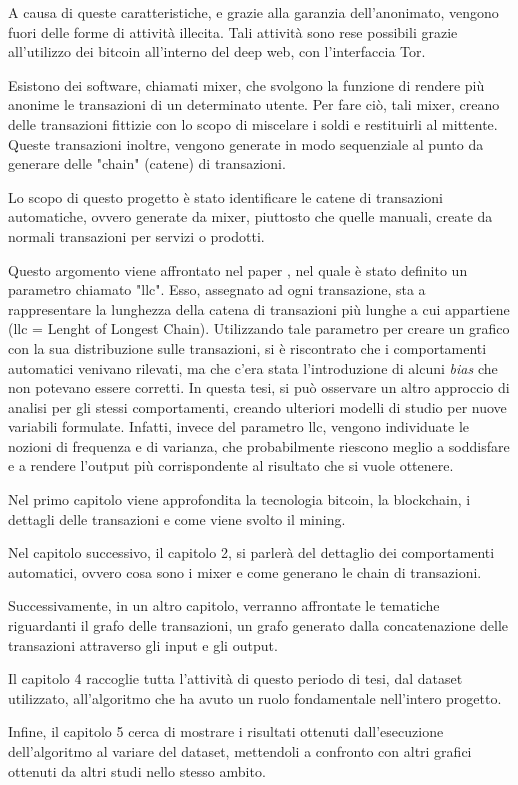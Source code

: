 A causa di queste caratteristiche, e grazie alla garanzia dell'anonimato, vengono fuori delle forme di attività illecita. Tali attività sono rese possibili grazie all'utilizzo dei bitcoin all'interno del deep web, con l'interfaccia Tor.

Esistono dei software, chiamati mixer, che svolgono la funzione di rendere più anonime le transazioni di un determinato utente. Per fare ciò, tali mixer, creano delle transazioni fittizie con lo scopo di miscelare i soldi e restituirli al mittente. Queste transazioni inoltre, vengono generate in modo sequenziale al punto da generare delle "chain" (catene) di transazioni.

Lo scopo di questo progetto è stato identificare le catene di transazioni automatiche, ovvero generate da mixer, piuttosto che quelle manuali, create da normali transazioni per servizi o prodotti.

Questo argomento viene affrontato nel paper \cite{ddp-ltcbh-17}, nel quale è stato definito un parametro chiamato "llc". Esso, assegnato ad ogni transazione, sta a rappresentare la lunghezza della catena di transazioni più lunghe a cui appartiene (llc = Lenght of Longest Chain). Utilizzando tale parametro per creare un grafico con la sua distribuzione sulle transazioni, si è riscontrato che i comportamenti automatici venivano rilevati, ma che c'era stata l'introduzione di alcuni \textit{bias} che non potevano essere corretti.
In questa tesi, si può osservare un altro approccio di analisi per gli stessi comportamenti, creando ulteriori modelli di studio per nuove variabili formulate. Infatti, invece del parametro llc, vengono individuate le nozioni di frequenza e di varianza, che probabilmente riescono meglio a soddisfare e a rendere l'output più corrispondente al risultato che si vuole ottenere. 

Nel primo capitolo viene approfondita la tecnologia bitcoin, la blockchain, i dettagli delle transazioni e come viene svolto il mining. 

Nel capitolo successivo, il capitolo 2, si parlerà del dettaglio dei comportamenti automatici, ovvero cosa sono i mixer e come generano le chain di transazioni.

Successivamente, in un altro capitolo, verranno affrontate le tematiche riguardanti il grafo delle transazioni, un grafo generato dalla concatenazione delle transazioni attraverso gli input e gli output.

Il capitolo 4 raccoglie tutta l'attività di questo periodo di tesi, dal dataset utilizzato, all'algoritmo che ha avuto un ruolo fondamentale nell'intero progetto.

Infine, il capitolo 5 cerca di mostrare i risultati ottenuti dall'esecuzione dell'algoritmo al variare del dataset, mettendoli a confronto con altri grafici ottenuti da altri studi nello stesso ambito.

